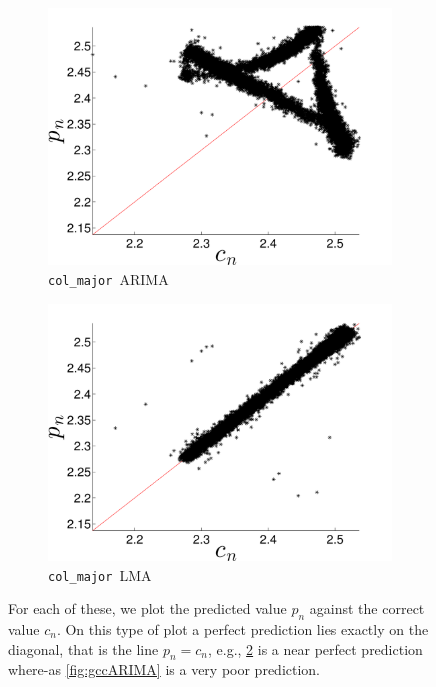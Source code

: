\documentclass{article}
\newcommand{\col}{{\tt col\_major}~}
\begin{document}
\begin{figure}[htbp]
\begin{subfigure}{0.49\textwidth}
    \includegraphics[width=\textwidth]{figs/colARIMAForecast}
    \caption{\col ARIMA}
    \label{fig:colARIMA}
  \end{subfigure}
    \begin{subfigure}{0.49\textwidth}
    \includegraphics[width=\textwidth]{figs/colLMAForecast}
    \caption{\col LMA}
    \label{fig:colLMA}
  \end{subfigure}
   \caption{
For each of these, we plot the predicted value $p_n$ against the correct value $c_n$. On this type of plot a perfect prediction lies exactly on the diagonal, that is the line $p_n = c_n$, e.g., \ref{fig:colLMA} is a near perfect prediction where-as \ref{fig:gccARIMA} is a very poor prediction. }\label{fig:gcc_vs_col}  
\end{figure} 
\end{document}
